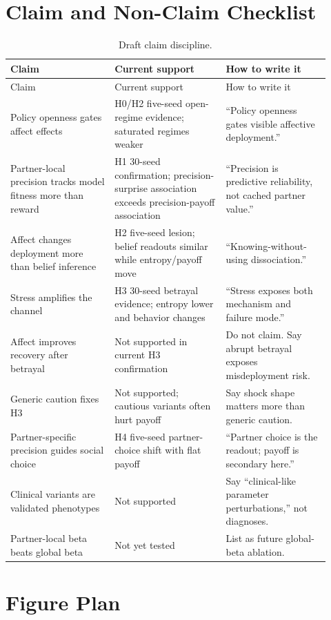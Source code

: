 \appendix

\section{Claim and Non-Claim Checklist}

\begin{longtable}{p{0.30\linewidth}p{0.32\linewidth}p{0.30\linewidth}}
\caption{Draft claim discipline.}\label{tab:claim-checklist}\\
\toprule
Claim & Current support & How to write it \\
\midrule
\endfirsthead
\toprule
Claim & Current support & How to write it \\
\midrule
\endhead
Policy openness gates affect effects & H0/H2 five-seed open-regime evidence; saturated regimes weaker & ``Policy openness gates visible affective deployment.'' \\
Partner-local precision tracks model fitness more than reward & H1 30-seed confirmation; precision-surprise association exceeds precision-payoff association & ``Precision is predictive reliability, not cached partner value.'' \\
Affect changes deployment more than belief inference & H2 five-seed lesion; belief readouts similar while entropy/payoff move & ``Knowing-without-using dissociation.'' \\
Stress amplifies the channel & H3 30-seed betrayal evidence; entropy lower and behavior changes & ``Stress exposes both mechanism and failure mode.'' \\
Affect improves recovery after betrayal & Not supported in current H3 confirmation & Do not claim. Say abrupt betrayal exposes misdeployment risk. \\
Generic caution fixes H3 & Not supported; cautious variants often hurt payoff & Say shock shape matters more than generic caution. \\
Partner-specific precision guides social choice & H4 five-seed partner-choice shift with flat payoff & ``Partner choice is the readout; payoff is secondary here.'' \\
Clinical variants are validated phenotypes & Not supported & Say ``clinical-like parameter perturbations,'' not diagnoses. \\
Partner-local beta beats global beta & Not yet tested & List as future global-beta ablation. \\
\bottomrule
\end{longtable}

\section{Figure Plan}

